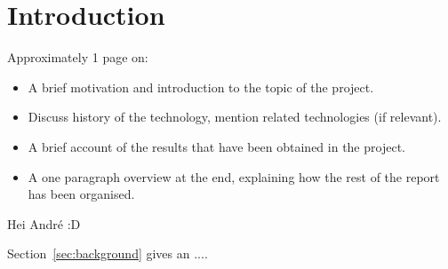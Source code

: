 \section{Introduction}
\label{sec:introduction}

Approximately 1 page on:

\begin{itemize}

\item A brief motivation and introduction to the topic of the project.

\item Discuss history of the technology, mention related technologies (if relevant).

\item A brief account of the results that have been obtained in the project.

\item A one paragraph overview at the end, explaining how the rest of
  the report has been organised.

\end{itemize}

\noindent
Hei André :D

Section~\ref{sec:background} gives an ....
